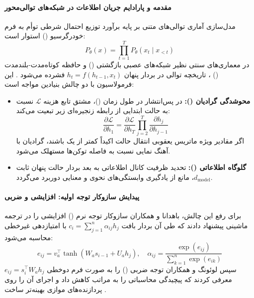 \item {}

\paragraph*{مقدمه و پارادایم جریان اطلاعات در شبکه‌های توالی‌محور}
مدل‌سازی آماری توالی‌های متنی بر پایه برآورد توزیع احتمال شرطی توأم به فرم خودرگرسیو () استوار است:
\begin{equation}
    P_\theta(x) = \prod_{t=1}^{T} P_\theta(x_t \mid x_{<t})
\end{equation}
در معماری‌های سنتی نظیر شبکه‌های عصبی بازگشتی () و حافظه کوتاه‌مدت-بلندمدت () \cite{hochreiter1997lstm}، تاریخچه توالی در بردار پنهان $h_t = f(h_{t-1}, x_t)$ فشرده می‌شود \cite{hays2026attention, hosseinzadeh2025attention}. این فرمولاسیون با دو چالش بنیادین مواجه است:
\begin{itemize}
    \item \textbf{محوشدگی گرادیان ():} در پس‌انتشار در طول زمان ()، مشتق تابع هزینه $\mathcal{L}$ نسبت به حالت ابتدایی از رابطه زنجیره‌ای زیر تبعیت می‌کند:
    \begin{equation}
        \frac{\partial \mathcal{L}}{\partial h_1} = \frac{\partial \mathcal{L}}{\partial h_T} \prod_{j=2}^{T} \frac{\partial h_j}{\partial h_{j-1}}
    \end{equation}
    اگر مقادیر ویژه ماتریس یعقوبی انتقال حالت اکیداً کمتر از یک باشند، گرادیان با آهنگ نمایی نسبت به فاصله توکن‌ها مستهلک می‌شود.
    \item \textbf{گلوگاه اطلاعاتی ():} تحدید ظرفیت کانال اطلاعاتی به بعد بردار حالت پنهان ثابت $d_{\text{model}}$، مانع از یادگیری وابستگی‌های نحوی و معنایی دوربرد می‌گردد.
\end{itemize}

\paragraph*{پیدایش سازوکار توجه اولیه: افزایشی و ضربی}
برای رفع این چالش، باهدانا و همکاران \cite{bahdanau2014neural} سازوکار توجه نرم () افزایشی را در ترجمه ماشینی پیشنهاد دادند که طی آن بردار بافت $c_i = \sum_{j=1}^{n} \alpha_{ij} h_j$ با امتیازدهی غیرخطی محاسبه می‌شود:
\begin{equation}
    e_{ij} = v_a^\top \tanh(W_a s_{i-1} + U_a h_j), \quad \alpha_{ij} = \frac{\exp(e_{ij})}{\sum_{k=1}^{n} \exp(e_{ik})}
\end{equation}
سپس لوئونگ و همکاران \cite{luong2015effective} توجه ضربی () را به صورت فرم دوخطی $e_{ij} = s_i^\top W_a h_j$ معرفی کردند که پیچیدگی محاسباتی را به مراتب کاهش داد و اجرای آن را روی پردازنده‌های موازی بهینه‌تر ساخت \cite{hays2026attention}.

